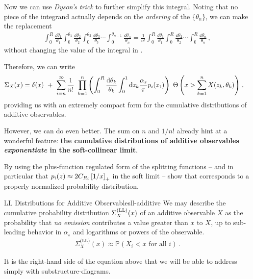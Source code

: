 \begin{example}
    Now we can use \textit{Dyson's trick} to further simplify this integral.
    Noting that no piece of the integrand actually depends on the \textit{ordering} of the \(\{\theta_n\}\), we can make the replacement
    \begin{align}
        \int_0^R \frac{\dd\theta_1}{\theta_1}
        \int_0^{\theta_1} \frac{\dd\theta_2}{\theta_2}
        \int_0^{\theta_2} \frac{\dd\theta_3}{\theta_3}
        \cdots
        \int_0^{\theta_{n-1}} \frac{\dd\theta_n}{\theta_n}
        =
        \frac{1}{n!}
        \int_0^R \frac{\dd\theta_1}{\theta_1}
        \int_0^R \frac{\dd\theta_2}{\theta_2}
        \cdots
        \int_0^R \frac{\dd\theta_n}{\theta_n}
        \,,
    \end{align}
    without changing the value of the integral in .

    Therefore, we can write
    \begin{align}
        \label{eq:dysons-additive-cumulative-distribution}
        \Sigma_X(x)
        &=
        \delta(x)
        \,\,
        +
        \,\,
        \sum_{i = n}^\infty
        \frac{1}{n!}
        \,\,
        \prod_{k = 1}^n
        \le(
        \int_0^R \frac{\dd\theta_k}{\theta_k}
        \int_0^1 \dd z_k
        \frac{\alpha_s}{\pi}
        p_i(z_1)
        \ri)
        \,\,
        \Theta\le(x > \sum_{k = 1}^n X(z_k, \theta_k)\ri)
        \,,
    \end{align}
    providing us with an extremely compact form for the cumulative distributions of additive observables.

    However, we can do even better.
    The sum on \(n\) and \(1/n!\) already hint at a wonderful feature:
    \textbf{the cumulative distributions of additive observables \textit{exponentiate} in the soft-collinear limit}.
\end{example}

\begin{exercise}
    By using the plus-function regulated form of the splitting functions -- and in particular that \(p_i(z) \approx 2 C_{R_i} \left[1 / x\right]_+\) in the soft limit -- show that  corresponds to a properly normalized probability distribution.
\end{exercise}


\begin{proposition}{LL Distributions for Additive Observables}{ll-additive}
    We may describe the  cumulative probability distribution \(\Sigma^{\rm(LL)}_X(x)\) of an additive observable \(X\) as the probability that \textit{no emission} contributes a value greater than \(x\) to \(X\), up to sub-leading behavior in \(\alpha_s\) and logarithms or powers of the observable.
    \begin{align}
        \label{eq:ll-additive}
        \Sigma^{\text{(LL)}}_X(x) \approx \mathbb{P}(X_i < x \text{ for all } i)
        \,.
    \end{align}

    It is the right-hand side of the equation above that we will be able to address simply with \glspl{substructure-diagram}.
\end{proposition}


